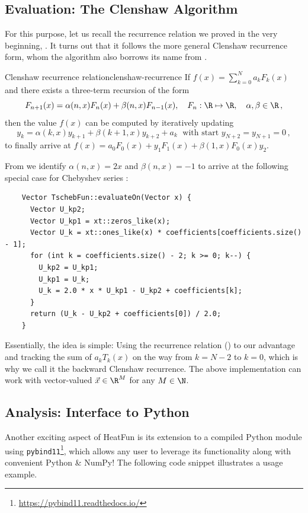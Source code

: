 \documentclass[12pt, a4paper]{article}
\newcommand{\chebyshev}{Chebyshev\xspace}
\newcommand{\heatfun}{\textcolor{themecolor3}{HeatFun}\xspace}
\begin{document}
  \subsection{Evaluation: The Clenshaw Algorithm}
  For this purpose, let us recall the recurrence relation we proved in the very beginning, .
  It turns out that it follows the more general Clenshaw recurrence form, whom the algorithm also borrows its name from \parencite[172-178]{art-of-sci-comp}.
  \begin{theorem}{Clenshaw recurrence relation}{clenshaw-recurrence}
    If $f(x) = \sum_{k=0}^N a_k F_k(x)$ and there exists a three-term recursion of the form
    $$F_{n+1}(x)=\alpha(n,x) F_n(x) + \beta(n,x) F_{n-1}(x),\quad F_n: \R \mapsto \R, \quad \alpha, \beta \in \R \,,$$
    then the value $f(x)$ can be computed by iteratively updating
    $$y_k = \alpha(k,x)y_{k+1}+\beta(k+1,x)y_{k+2}+a_k \; \text{ with start } y_{N+2} = y_{N+1} = 0\,,$$
    to finally arrive at $f(x) = a_0F_0(x)+y_1F_1(x)+\beta(1,x)F_0(x)y_2$.
  \end{theorem}

  From  we identify $\alpha(n, x) = 2x$ and $\beta(n, x) = -1$ to arrive at the following special case for \chebyshev series \parencite{Broucke1973TenSF}:
  \begin{verbatim}
    Vector TschebFun::evaluateOn(Vector x) {
      Vector U_kp2;
      Vector U_kp1 = xt::zeros_like(x);
      Vector U_k = xt::ones_like(x) * coefficients[coefficients.size() - 1];
      for (int k = coefficients.size() - 2; k >= 0; k--) {
        U_kp2 = U_kp1;
        U_kp1 = U_k;
        U_k = 2.0 * x * U_kp1 - U_kp2 + coefficients[k];
      }
      return (U_k - U_kp2 + coefficients[0]) / 2.0;
    }
  \end{verbatim}

  Essentially, the idea is simple: Using the recurrence relation () to our advantage and tracking the sum of $a_k T_k(x)$ on the way from $k = N-2$ to $k=0$, which is why we call it the backward Clenshaw recurrence.
  The above implementation can work with vector-valued $\vec{x} \in \R^M$ for any $M \in \N$.

  \subsection{Analysis: Interface to Python}
  Another exciting aspect of \heatfun is its extension to a compiled Python module using \texttt{pybind11}\footnote{\url{https://pybind11.readthedocs.io/}}, which allows any user to leverage its functionality along with convenient Python \& NumPy! The following code snippet illustrates a usage example.
\end{document}
